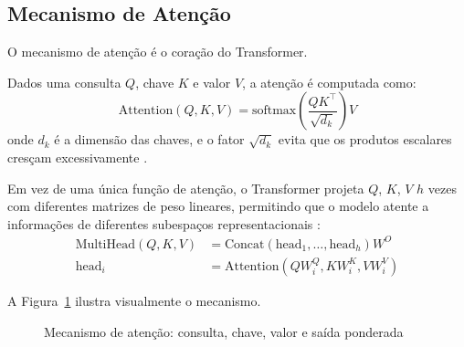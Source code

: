 \subsection{Mecanismo de Atenção}
O mecanismo de atenção é o coração do Transformer.
\begin{definicao}
Dados uma consulta $Q$, chave $K$ e valor $V$, a atenção é computada como:
\[\text{Attention}(Q, K, V) = \text{softmax}\left(\frac{QK^\top}{\sqrt{d_k}}\right)V
\]
onde $d_k$ é a dimensão das chaves, e o fator $\sqrt{d_k}$ evita que os
produtos escalares cresçam excessivamente \cite{vaswani2017attention}.
\end{definicao}
\begin{definicao}
Em vez de uma única função de atenção, o Transformer projeta $Q$, $K$, $V$
$h$ vezes com diferentes matrizes de peso lineares, permitindo que o modelo
atente a informações de diferentes subespaços representacionais
\cite{vaswani2017attention}:
\begin{align*}
\text{MultiHead}(Q, K, V) &= \text{Concat}(\text{head}_1, \ldots, \text{head}_h) W^O \\
\text{head}_i &= \text{Attention}(Q W_i^Q, K W_i^K, V W_i^V)
\end{align*}
\end{definicao}
A Figura~\ref{fig:attention} ilustra visualmente o mecanismo.
\begin{figure}[htb]
\centering
\caption{Mecanismo de atenção: consulta, chave, valor e saída ponderada}
\label{fig:attention}
\end{figure}
